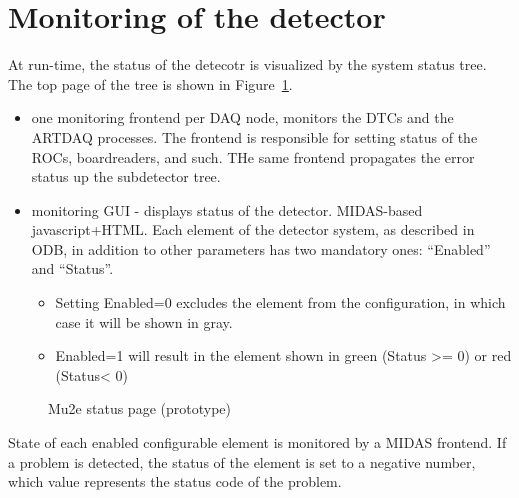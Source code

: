 \section{Monitoring of the detector}

At run-time, the status of the detecotr is visualized by the system status tree.
The top page of the tree is shown in Figure~\ref{figure:mu2e_status_page}.

\begin{itemize}
\item
  one monitoring frontend per DAQ node, monitors the DTCs and the ARTDAQ processes.
  The frontend is responsible for setting status of the ROCs, boardreaders, and such.
  THe same frontend propagates the error status up the subdetector tree. 
  \item
  monitoring GUI - displays status of the detector. MIDAS-based javascript+HTML.
  Each element of the detector system, as described in ODB, in addition to other parameters
  has two mandatory ones: ``Enabled'' and ``Status''.
  \begin{itemize}
  \item 
    Setting Enabled=0 excludes the element from the configuration, in which case it will be
    shown in gray.
  \item
    Enabled=1 will result in the element shown in green (Status >= 0) or red (Status< 0) 
  \end{itemize}
\end{itemize}

\begin{figure}[H]
  \caption{
    \label{figure:mu2e_status_page}
    Mu2e status page (prototype)
  }
\end{figure}

State of each enabled configurable element is monitored by a MIDAS frontend.
If a problem is detected, the status of the element is set to a negative
number, which value represents the status code of the problem.

